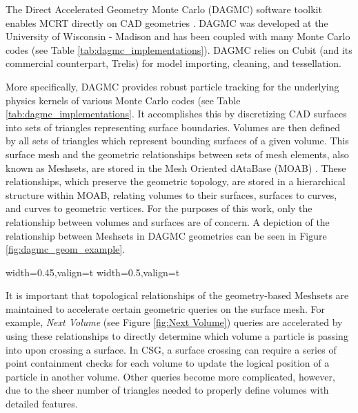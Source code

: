 The Direct Accelerated Geometry Monte Carlo (DAGMC) software toolkit enables
MCRT directly on CAD geometries \cite{Tautges_2009}. DAGMC was developed at the
University of Wisconsin - Madison and has been coupled with many Monte Carlo
codes (see Table \ref{tab:dagmc_implementations}). DAGMC relies on
Cubit\cite{Blacker_1994} (and its commercial counterpart,
Trelis\cite{Trelis_2018}) for model importing, cleaning, and tessellation.

More specifically, DAGMC provides robust particle tracking for the underlying
physics kernels of various Monte Carlo codes (see Table
\ref{tab:dagmc_implementations}. It accomplishes this by discretizing CAD
surfaces into sets of triangles representing surface boundaries. Volumes are
then defined by all sets of triangles which represent bounding surfaces of a
given volume. This surface mesh and the geometric relationships between sets of
mesh elements, also known as Meshsets, are stored in the Mesh Oriented dAtaBase
(MOAB) \cite{Tautges_2004}. These relationships, which preserve the geometric
topology, are stored in a hierarchical structure within MOAB, relating volumes
to their surfaces, surfaces to curves, and curves to geometric vertices. For the
purposes of this work, only the relationship between volumes and surfaces are of
concern. A depiction of the relationship between Meshsets in DAGMC geometries
can be seen in Figure \ref{fig:dagmc_geom_example}.

\begin{sidewaysfigure}
  \centering
  {width=0.45\textwidth,valign=t}
  {width=0.5\textwidth,valign=t}
  \caption[The DAGMC data model in MOAB.]{Left: Partial representation of a discretized DAGMC geometry. Right:
    A representation of the mesh-based hierarchy used to maintain topological
    information about the CAD geometry in MOAB.}
  \label{fig:dagmc_geom_example}
\end{sidewaysfigure}

It is important that topological relationships of the geometry-based Meshsets
are maintained to accelerate certain geometric queries on the surface mesh. For
example, \textit{Next Volume} (see Figure \ref{fig:Next Volume}) queries are
accelerated by using these relationships to directly determine which volume a
particle is passing into upon crossing a surface. In CSG, a surface crossing can
require a series of point containment checks for each volume to update the
logical position of a particle in another volume. Other queries become more
complicated, however, due to the sheer number of triangles needed to properly
define volumes with detailed features.

